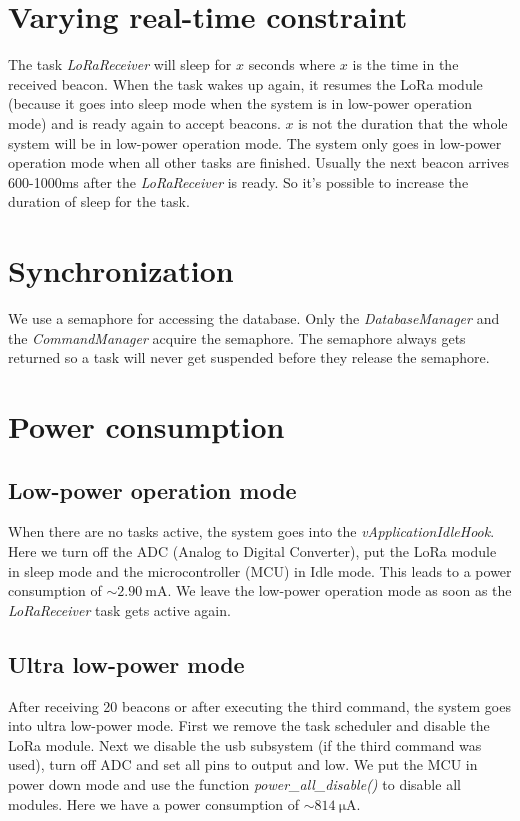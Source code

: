 \documentclass{scrartcl}
\begin{document}
\section{Varying real-time constraint}
The task \textit{LoRaReceiver} will sleep for $x$ seconds where $x$ is the time in the received beacon.
When the task wakes up again, it resumes the LoRa module (because it goes into sleep mode when the system is in low-power operation mode)
and is ready again to accept beacons. $x$ is not the duration that the whole system will be in low-power operation mode.
The system only goes in low-power operation mode when all other tasks are finished.
Usually the next beacon arrives 600-1000ms after the \textit{LoRaReceiver} is ready. So it's possible to increase
the duration of sleep for the task.

\section{Synchronization}
We use a semaphore for accessing the database. Only the \textit{DatabaseManager} and the \textit{CommandManager} acquire the semaphore.
The semaphore always gets returned so a task will never get suspended before they release the semaphore.

\newpage

\section{Power consumption}
\subsection{Low-power operation mode}
When there are no tasks active, the system goes into the \textit{vApplicationIdleHook}.
Here we turn off the ADC (Analog to Digital Converter),
put the LoRa module in sleep mode and the microcontroller (MCU) in Idle mode.
This leads to a power consumption of $\sim \SI{2.90}{\milli\ampere}$.
We leave the low-power operation mode as soon as the \textit{LoRaReceiver} task gets active again.

\subsection{Ultra low-power mode}
After receiving 20 beacons or after executing the third command, the system goes into ultra low-power mode.
First we remove the task scheduler and disable the LoRa module.
Next we disable the usb subsystem (if the third command was used), turn off ADC and set all pins to output and low.
We put the MCU in power down mode and use the function \textit{power\_all\_disable()} to disable all modules.
Here we have a power consumption of $\sim \SI{814}{\micro\ampere}$.
\end{document}
